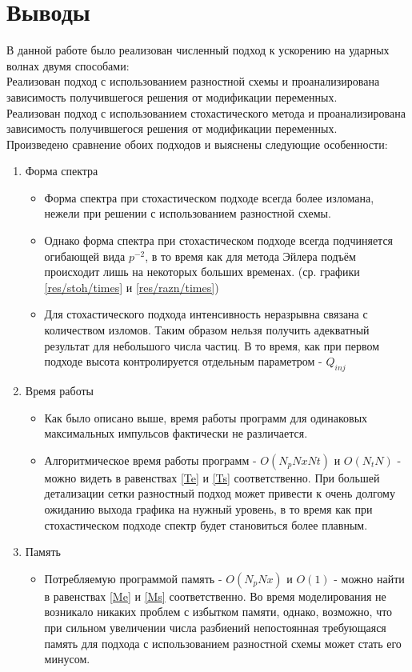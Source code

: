 \documentclass[a4paper,14pt]{extarticle} %
\begin{document}
\section{Выводы}
В данной работе было реализован численный подход к ускорению на ударных волнах двумя способами:\\
Реализован подход с использованием разностной схемы и проанализирована зависимость получившегося решения от модификации переменных.\\
Реализован подход с использованием стохастического метода и проанализирована зависимость получившегося решения от модификации переменных.\\
Произведено сравнение обоих подходов и выяснены следующие особенности:
\begin{enumerate}
\item Форма спектра
\begin{itemize}
\item Форма спектра при стохастическом подходе всегда более изломана, нежели при решении с использованием разностной схемы.
\item Однако форма спектра при стохастическом подходе всегда подчиняется огибающей вида $p^{-2}$, в то время как для метода Эйлера подъём происходит лишь на некоторых больших временах. (ср. графики \ref{res/stoh/times} и \ref{res/razn/times})
\item Для стохастического подхода интенсивность неразрывна связана с количеством изломов. Таким образом нельзя получить адекватный результат для небольшого числа частиц. В то время, как при первом подходе высота контролируется отдельным параметром - $Q_{inj}$
\end{itemize}
\item Время работы
\begin{itemize}
\item Как было описано выше, время работы программ для одинаковых максимальных импульсов фактически не различается.
\item Алгоритмическое время работы программ - $O(N_pNxNt)$ и $O(N_tN)$ - можно видеть в равенствах \ref{Te} и \ref{Ts} соответственно. При большей детализации сетки разностный подход может привести к очень долгому ожиданию выхода графика на нужный уровень, в то время как при стохастическом подходе спектр будет становиться более плавным.
\end{itemize}
\item Память
\begin{itemize}
\item Потребляемую программой память - $O(N_pNx)$ и $O(1)$ - можно найти в равенствах \ref{Me} и \ref{Ms} соответственно. Во время моделирования не возникало никаких проблем с избытком памяти, однако, возможно, что при сильном увеличении числа разбиений непостоянная требующаяся память для подхода с использованием разностной схемы может стать его минусом.

\end{itemize}
\end{enumerate}
\end{document}
